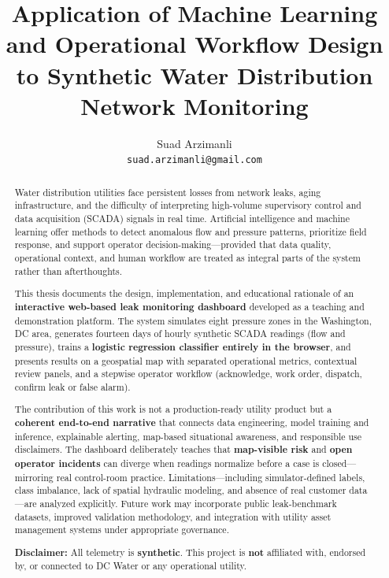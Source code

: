 \documentclass[12pt,a4paper]{article}
\title{Application of Machine Learning and Operational Workflow Design to Synthetic Water Distribution Network Monitoring}
\author{Suad Arzimanli \\ \texttt{suad.arzimanli@gmail.com}}
\date{}
\begin{document}
\maketitle

\begin{abstract}
Water distribution utilities face persistent losses from network leaks, aging infrastructure, and the difficulty of interpreting high-volume supervisory control and data acquisition (SCADA) signals in real time. Artificial intelligence and machine learning offer methods to detect anomalous flow and pressure patterns, prioritize field response, and support operator decision-making---provided that data quality, operational context, and human workflow are treated as integral parts of the system rather than afterthoughts.

This thesis documents the design, implementation, and educational rationale of an \textbf{interactive web-based leak monitoring dashboard} developed as a teaching and demonstration platform. The system simulates eight pressure zones in the Washington, DC area, generates fourteen days of hourly synthetic SCADA readings (flow and pressure), trains a \textbf{logistic regression classifier entirely in the browser}, and presents results on a geospatial map with separated operational metrics, contextual review panels, and a stepwise operator workflow (acknowledge, work order, dispatch, confirm leak or false alarm).

The contribution of this work is not a production-ready utility product but a \textbf{coherent end-to-end narrative} that connects data engineering, model training and inference, explainable alerting, map-based situational awareness, and responsible use disclaimers. The dashboard deliberately teaches that \textbf{map-visible risk} and \textbf{open operator incidents} can diverge when readings normalize before a case is closed---mirroring real control-room practice. Limitations---including simulator-defined labels, class imbalance, lack of spatial hydraulic modeling, and absence of real customer data---are analyzed explicitly. Future work may incorporate public leak-benchmark datasets, improved validation methodology, and integration with utility asset management systems under appropriate governance.

\medskip
\noindent\textbf{Disclaimer:} All telemetry is \textbf{synthetic}. This project is \textbf{not} affiliated with, endorsed by, or connected to DC Water or any operational utility.
\end{abstract}
\end{document}
